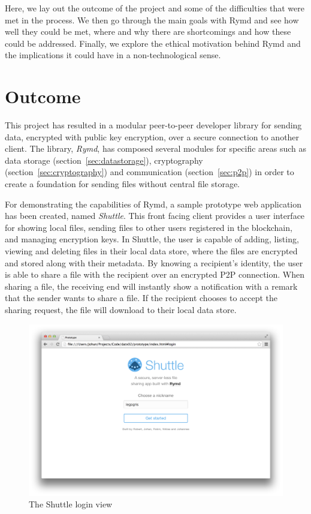 Here, we lay out the outcome of the project and some of the difficulties that were met in the process. We then go through the main goals with Rymd and see how well they could be met, where and why there are shortcomings and how these could be addressed. Finally, we explore the ethical motivation behind Rymd and the implications it could have in a non-technological sense.

\section{Outcome}
This project has resulted in a modular peer-to-peer developer library for sending data, encrypted with public key encryption, over a secure connection to another client. The library, \emph{Rymd}, has composed several modules for specific areas such as data storage (section~\ref{sec:datastorage}), cryptography (section~\ref{sec:cryptography}) and communication (section~\ref{sec:p2p}) in order to create a foundation for sending files without central file storage.

For demonstrating the capabilities of Rymd, a sample prototype web application has been created, named \emph{Shuttle}. This front facing client provides a user interface for showing local files, sending files to other users registered in the blockchain, and managing encryption keys. In Shuttle, the user is capable of adding, listing, viewing and deleting files in their local data store, where the files are encrypted and stored along with their metadata. By knowing a recipient's identity, the user is able to share a file with the recipient over an encrypted P2P connection. When sharing a file, the receiving end will instantly show a notification with a remark that the sender wants to share a file. If the recipient chooses to accept the sharing request, the file will download to their local data store.

\begin{figure}[h]
\centering
\includegraphics[width=\textwidth,height=0.2\paperheight,keepaspectratio
]{figures/shuttle-login}
\caption{The Shuttle login view}
\label{fig:shuttle-login}
\end{figure}

